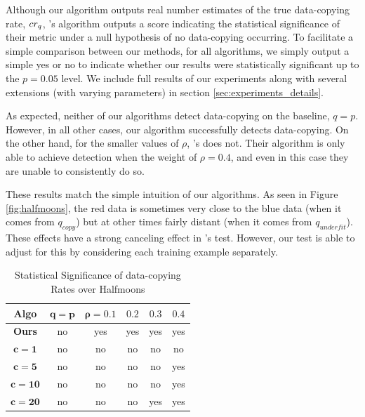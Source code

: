 Although our algorithm outputs real number estimates of the true data-copying rate, $cr_q$, \cite{MCD2020}'s algorithm outputs a score indicating the statistical significance of their metric under a null hypothesis of no data-copying occurring. To facilitate a simple comparison between our methods, for all algorithms, we simply output a simple yes or no to indicate whether our results were statistically significant up to the $p=0.05$ level. We include full results of our experiments along with several extensions (with varying parameters) in section \ref{sec:experiments_details}.

As expected, neither of our algorithms detect data-copying on the baseline, $q = p$. However, in all other cases, our algorithm successfully detects data-copying. On the other hand, for the smaller values of $\rho$, \cite{MCD2020}'s does not. Their algorithm is only able to achieve detection when the weight of $\rho = 0.4$, and even in this case they are unable to consistently do so.  

These results match the simple intuition of our algorithms. As seen in Figure \ref{fig:halfmoons}, the red data is sometimes very close to the blue data (when it comes from $q_{copy}$) but at other times fairly distant (when it comes from $q_{underfit}$). These effects have a strong canceling effect in \cite{MCD2020}'s test. However, our test is able to adjust for this by considering each training example separately. 


\begin{table}[h]
\caption{Statistical Significance of data-copying Rates over Halfmoons} \label{results}
\begin{center}
\begin{tabular}{ |c||c|c|c|c|c| } 
 \hline
 \textbf{Algo} & $\mathbf{q = p}$ & $\mathbf{\rho = 0.1}$ & $\mathbf{0.2}$ & $\mathbf{0.3}$ & $\mathbf{0.4}$ \\ 
 \hline
 \hline
 \textbf{Ours} & \color{blue}no & \color{red}yes & \color{red}yes & \color{red}yes & \color{red}yes \\ 
 \hline
 $\mathbf{c=1}$ & \color{blue}no & \color{blue}no & \color{blue}no & \color{blue}no & \color{blue}no \\ 
 \hline
 $\mathbf{c=5}$ & \color{blue}no & \color{blue}no & \color{blue}no & \color{blue}no & \color{red}yes \\ 
 \hline
 $\mathbf{c=10}$ & \color{blue}no & \color{blue}no & \color{blue}no & \color{blue}no & \color{red}yes \\ 
 \hline
 $\mathbf{c=20}$ & \color{blue}no & \color{blue}no& \color{blue}no & \color{red}yes & \color{red}yes\\ 
 \hline
\end{tabular}
\end{center}
\end{table}

